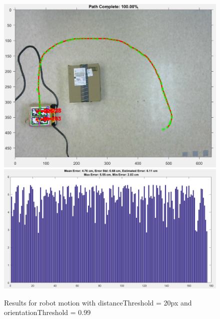 \documentclass[12pt,american]{report}
\begin{document}
\begin{figure}[h!]
\centering
\includegraphics[scale=.25]{images/PATH-2099.PNG}
\includegraphics[scale=.25]{images/DATA-2099.PNG}
\caption{Results for robot motion with distanceThreshold = 20px and orientationThreshold = 0.99}
\label{fig:results2}
\end{figure}
\end{document}
